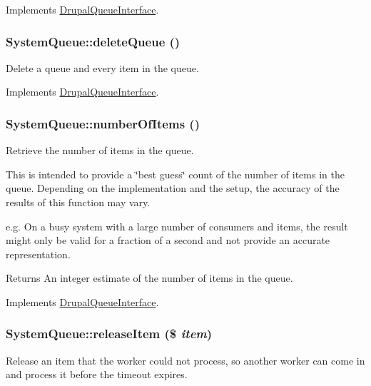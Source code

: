 Implements \hyperlink{interfaceDrupalQueueInterface_aa61212089c1bcc410e8f87f8e619e351}{DrupalQueueInterface}.\hypertarget{classSystemQueue_a28faefc0b81477b2dbfa1434236f3bb5}{
\subsubsection[{deleteQueue}]{\setlength{\rightskip}{0pt plus 5cm}SystemQueue::deleteQueue ()}}
\label{classSystemQueue_a28faefc0b81477b2dbfa1434236f3bb5}
Delete a queue and every item in the queue. 

Implements \hyperlink{interfaceDrupalQueueInterface_ad403fed96dbd86e64a8a48c33fe5f2bc}{DrupalQueueInterface}.\hypertarget{classSystemQueue_af5df5ad6fbfde21170f2e03115a7f7da}{
\subsubsection[{numberOfItems}]{\setlength{\rightskip}{0pt plus 5cm}SystemQueue::numberOfItems ()}}
\label{classSystemQueue_af5df5ad6fbfde21170f2e03115a7f7da}
Retrieve the number of items in the queue.

This is intended to provide a \char`\"{}best guess\char`\"{} count of the number of items in the queue. Depending on the implementation and the setup, the accuracy of the results of this function may vary.

e.g. On a busy system with a large number of consumers and items, the result might only be valid for a fraction of a second and not provide an accurate representation.

\begin{DoxyReturn}{Returns}
An integer estimate of the number of items in the queue. 
\end{DoxyReturn}


Implements \hyperlink{interfaceDrupalQueueInterface_aee5a22d355c9e6246690d0ed79fe306b}{DrupalQueueInterface}.\hypertarget{classSystemQueue_aac7e2e13e33ebba60d4594b3de6a22df}{
\subsubsection[{releaseItem}]{\setlength{\rightskip}{0pt plus 5cm}SystemQueue::releaseItem (\$ {\em item})}}
\label{classSystemQueue_aac7e2e13e33ebba60d4594b3de6a22df}
Release an item that the worker could not process, so another worker can come in and process it before the timeout expires.


